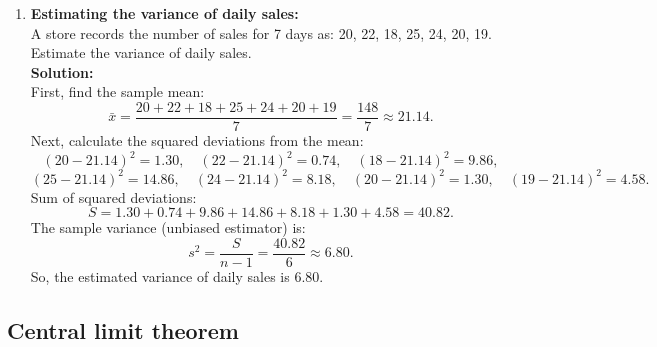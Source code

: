 \documentclass{book}
\begin{document}
\begin{enumerate}
    \item \textbf{Estimating the variance of daily sales:} \\
    A store records the number of sales for 7 days as: 20, 22, 18, 25, 24, 20, 19. Estimate the variance of daily sales. \\
    
    \textbf{Solution:} \\
    First, find the sample mean:
    \[
    \bar{x} = \frac{20 + 22 + 18 + 25 + 24 + 20 + 19}{7} = \frac{148}{7} \approx 21.14.
    \]
    Next, calculate the squared deviations from the mean:
    \[
    (20 - 21.14)^2 = 1.30, \quad (22 - 21.14)^2 = 0.74, \quad (18 - 21.14)^2 = 9.86,
    \]
    \[
    (25 - 21.14)^2 = 14.86, \quad (24 - 21.14)^2 = 8.18, \quad (20 - 21.14)^2 = 1.30, \quad (19 - 21.14)^2 = 4.58.
    \]
    Sum of squared deviations:
    \[
    S = 1.30 + 0.74 + 9.86 + 14.86 + 8.18 + 1.30 + 4.58 = 40.82.
    \]
    The sample variance (unbiased estimator) is:
    \[
    s^2 = \frac{S}{n-1} = \frac{40.82}{6} \approx 6.80.
    \]
    So, the estimated variance of daily sales is \(\boxed{6.80}\).

\end{enumerate}

\subsection*{Central limit theorem}
\end{document}
